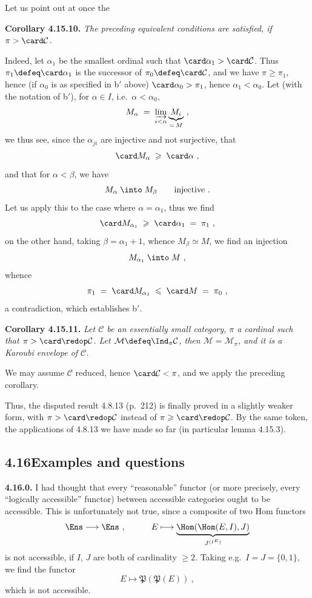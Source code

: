
Let us point out at once the

\textbf{Corollary 4.15.10.} \textit{The preceding equivalent conditions are satisfied, if $\pi > \card\mathcal{C}$.}

Indeed, let $\alpha_1$ be the smallest ordinal such that $\card\alpha_1 > \card\mathcal{C}$. Thus $\pi_1 \defeq \card\alpha_1$ is the successor of $\pi_0 \defeq \card\mathcal{C}$, and we have $\pi \geqslant \pi_1$, hence (if $\alpha_0$ is as specified in b$'$ above) $\card\alpha_0 > \pi_1$, hence $\alpha_1 < \alpha_0$. Let (with the notation of b$'$), for $\alpha \in I$, i.e.\ $\alpha < \alpha_0$,
\[
M_\alpha \;=\; \varinjlim_{i<\alpha} \underbrace{M_i}_{=\,M}\ ,
\]
we thus see, since the $\alpha_{ji}$ are injective and not surjective, that
\[
\card M_\alpha \;\geqslant\; \card\alpha\ ,
\]
and that for $\alpha < \beta$, we have
\[
M_\alpha \;\into\; M_\beta \qquad \text{injective}\ .
\]
Let us apply this to the case where $\alpha = \alpha_1$, thus we find
\[
\card M_{\alpha_1} \;\geqslant\; \card\alpha_1 \;=\; \pi_1\ ,
\]
on the other hand, taking $\beta = \alpha_1 + 1$, whence $M_\beta \simeq M$, we find an injection
\[
M_{\alpha_1} \;\into\; M\ ,
\]
whence
\[
\pi_1 \;=\; \card M_{\alpha_1} \;\leqslant\; \card M \;=\; \pi_0\ ,
\]
a contradiction, which establishes b$'$.

\textbf{Corollary 4.15.11.} \textit{Let $\mathcal{C}$ be an essentially small category, $\pi$ a cardinal such that $\pi > \card\redop\mathcal{C}$. Let $\mathcal{M} \defeq \Ind_\pi\mathcal{C}$, then $\mathcal{M} = \mathcal{M}_\pi$, and it is a Karoubi envelope of $\mathcal{C}$.}

We may assume $\mathcal{C}$ reduced, hence $\card\mathcal{C} < \pi$, and we apply the preceding corollary.

Thus, the disputed result 4.8.13 (p.~212) is finally proved in a slightly weaker form, with $\pi > \card\redop\mathcal{C}$ instead of $\pi \geqslant \card\redop\mathcal{C}$. By the same token, the applications of 4.8.13 we have made so far (in particular lemma 4.15.3).


\subsection*{4.16\quad Examples and questions}

\textbf{4.16.0.} I had thought that every ``reasonable'' functor (or more precisely, every ``logically accessible'' functor) between accessible categories ought to be accessible. This is unfortunately not true, since a composite of two Hom functors
\[
\Ens \longrightarrow \Ens\ , \qquad\quad E \longmapsto \underbrace{\Hom(\Hom(E,I),J)}_{J^{(I^E)}}
\]
is not accessible, if $I$, $J$ are both of cardinality $\geqslant 2$. Taking e.g.\ $I = J = \{0,1\}$, we find the functor
\[
E \longmapsto \mathfrak{P}(\mathfrak{P}(E))\ ,
\]
which is not accessible.

